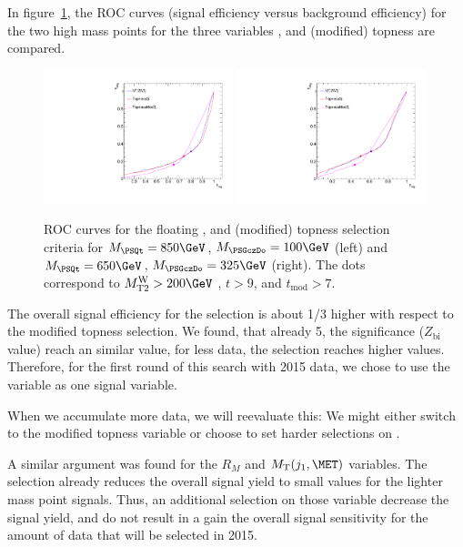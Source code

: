In figure~\ref{fig:sigvarstudy:MT2WvsTopness:ROC}, the ROC curves (signal efficiency versus background efficiency) for the two high mass points for the three variables \MTtW, and (modified) topness are compared.
\begin{figure}
\includegraphics[width=0.49\textwidth]{Figures/SignalVariableStudies/ROC_j3Compare_Stop_850_100.pdf}
\includegraphics[width=0.49\textwidth]{Figures/SignalVariableStudies/ROC_j3Compare_Stop_650_325.pdf}
\caption{\label{fig:sigvarstudy:MT2WvsTopness:ROC} ROC curves for the floating \MTtW, and (modified) topness selection criteria for $M_{\PSQt} = 850\GeV$, $M_{\PSGczDo} = 100\GeV$ (left) and $M_{\PSQt} = 650\GeV$, $M_{\PSGczDo} = 325\GeV$ (right). The dots correspond to $\MTtW>200\GeV$ , $t> 9$, and $t_\mathrm{mod}> 7$.}
\end{figure}

The overall signal efficiency for the \MTtW selection is about 1/3 higher with respect to the modified topness selection.
We found, that already 5\fbinv, the significance ($Z_\mathrm{bi}$ value) reach an similar value, for less data, the \MTtW selection reaches higher values. Therefore, for the first round of this search with 2015 data, we chose to use the \MTtW variable as one signal variable.

When we accumulate more data, we will reevaluate this: We might either switch to the modified topness variable or choose to set harder selections on \MET.

A similar argument was found for the $R_M$ and $\MT(j_1,\MET)$  variables. The \MET selection already reduces the overall signal yield to small values for the lighter mass point signals. Thus, an additional selection on those variable decrease the signal yield, and do not result in a gain the overall signal sensitivity for the amount of data that will be selected in 2015.

